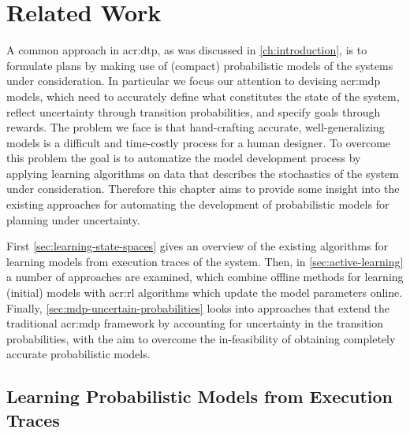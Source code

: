 \chapter{Related Work}
\label{ch:problem-related-work}

A common approach in \acrshort{acr:dtp}, as was discussed in \autoref{ch:introduction}, is to formulate plans by making use of (compact) probabilistic models of the systems under consideration.
In particular we focus our attention to devising \acrshort{acr:mdp} models, which need to accurately define what constitutes the state of the system, reflect uncertainty through transition probabilities, and specify goals through rewards.
The problem we face is that hand-crafting accurate, well-generalizing models is a difficult and time-costly process for a human designer.
To overcome this problem the goal is to automatize the model development process by applying learning algorithms on data that describes the stochastics of the system under consideration.
Therefore this chapter aims to provide some insight into the existing approaches for automating the development of probabilistic models for planning under uncertainty.

First \autoref{sec:learning-state-spaces} gives an overview of the existing algorithms for learning models from execution traces of the system.
Then, in \autoref{sec:active-learning} a number of approaches are examined, which combine offline methods for learning (initial) models with \acrshort{acr:rl} algorithms which update the model parameters online.
Finally, \autoref{sec:mdp-uncertain-probabilities} looks into approaches that extend the traditional \acrshort{acr:mdp} framework by accounting for uncertainty in the transition probabilities, with the aim to overcome the in-feasibility of obtaining completely accurate probabilistic models.

%

\section{Learning Probabilistic Models from Execution Traces}
\label{sec:learning-state-spaces}


